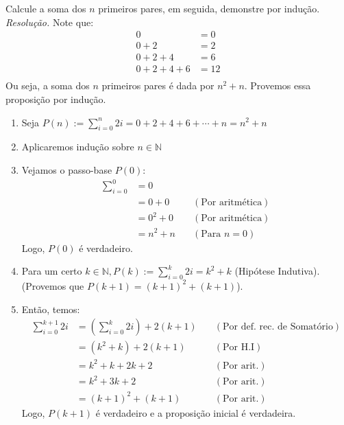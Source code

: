 Calcule a soma dos $n$ primeiros pares, em seguida, demonstre por indução. \\
\emph{Resolução.}
Note que:
\begin{align*}
	0 &= 0 \\
	0 + 2 &= 2 \\
	0 + 2 + 4 &= 6 \\
	0 + 2 + 4 + 6 &= 12 \\
\end{align*}
Ou seja, a soma dos $n$ primeiros pares é dada por $n^2 + n$. Provemos essa proposição por indução. \\
\begin{enumerate}
	\item Seja $P(n):= \sum\limits_{i = 0}^{n}2i = 0 + 2 + 4 + 6 + \cdots + n = n^2 + n$ \\
	\item Aplicaremos indução sobre $n \in \mathbb{N}$ \\
	\item Vejamos o passo-base $P(0)$: 
		\begin{align*}
			\sum\limits_{i = 0}^{0} &= 0  \\	
			&= 0 + 0 &\quad(\text{Por aritmética}) \\
			&= 0^2 + 0 &\quad(\text{Por aritmética}) \\
			&= n^2 + n &\quad(\text{Para $n = 0$})
		\end{align*}
	Logo, $P(0)$ é verdadeiro. \\
	\item Para um certo $k \in \mathbb{N}, P(k):= \sum\limits_{i = 0}^{k}2i = k^2 + k$ (Hipótese Indutiva). \\
	(Provemos que $P(k + 1) = (k + 1)^2 + (k + 1)$). \\
	\item Então, temos:
		\begin{align*}
			\sum\limits_{i=0}^{k + 1}2i &= (\sum\limits_{i = 0}^{k}2i) + 2(k + 1) &\quad(\text{Por def. rec. de Somatório}) \\
			&= (k^2 + k) + 2(k + 1) &\quad(\text{Por H.I}) \\
			&= k^2 + k + 2k + 2 &\quad(\text{Por arit.}) \\
			&= k^2 + 3k + 2 &\quad(\text{Por arit.})\\
			&= (k + 1)^2 + (k + 1) &\quad(\text{Por arit.})
		\end{align*}	
	Logo, $P(k + 1)$ é verdadeiro e a proposição inicial é verdadeira.
\end{enumerate}

